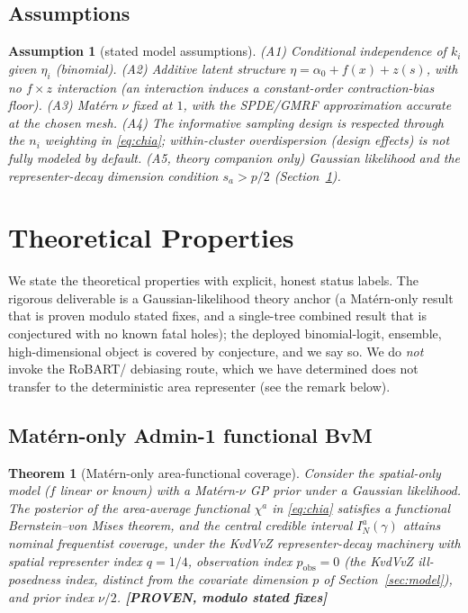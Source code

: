 \documentclass[11pt]{article}
\newtheorem{theorem}{Theorem}
\newtheorem{assumption}{Assumption}
\theoremstyle{remark}
\newcommand{\PROVENMOD}{\textnormal{\textbf{\textcolor{green!40!black}{[PROVEN, modulo stated fixes]}}}}
\newcommand{\chia}{\chi^a}
\begin{document}
\subsection{Assumptions}\label{sec:assumptions}

\begin{assumption}[stated model assumptions]\label{ass:model}
(A1) Conditional independence of $k_i$ given $\eta_i$ (binomial). (A2) Additive
latent structure $\eta=\alpha_0+f(x)+z(s)$, with no $f\times z$ interaction (an
interaction induces a constant-order contraction-bias floor). (A3) Mat\'ern $\nu$
fixed at $1$, with the SPDE/GMRF approximation accurate at the chosen mesh.
(A4) The informative sampling design is respected through the $n_i$ weighting in
\eqref{eq:chia}; within-cluster overdispersion (design effects) is not fully
modeled by default. (A5, theory companion only) Gaussian likelihood and the
representer-decay dimension condition $s_a>p/2$ (Section~\ref{sec:theory}).
\end{assumption}

\section{Theoretical Properties}\label{sec:theory}

We state the theoretical properties with explicit, honest status labels. The
rigorous deliverable is a Gaussian-likelihood theory anchor (a Mat\'ern-only
result that is proven modulo stated fixes, and a single-tree combined result
that is conjectured with no known fatal holes); the deployed binomial-logit,
ensemble, high-dimensional object is covered by conjecture, and we say so. We do
\emph{not} invoke the RoBART/\citet{breunig2025robart} debiasing route, which we
have determined does not transfer to the deterministic area representer (see the
remark below).

\subsection{Mat\'ern-only Admin-1 functional BvM}

\begin{theorem}[Mat\'ern-only area-functional coverage]\label{thm:matern}
Consider the spatial-only model ($f$ linear or known) with a Mat\'ern-$\nu$ GP
prior under a Gaussian likelihood. The posterior of the area-average functional
$\chia$ in \eqref{eq:chia} satisfies a functional Bernstein--von Mises theorem,
and the central credible interval $I^a_N(\gamma)$ attains nominal frequentist
coverage, under the KvdVvZ \citep{knapik2011bayesian} representer-decay machinery
with spatial representer index $q=1/4$, observation index $p_{\mathrm{obs}}=0$
(the KvdVvZ ill-posedness index, distinct from the covariate dimension $p$ of
Section~\ref{sec:model}), and prior index $\nu/2$. \PROVENMOD
\end{theorem}
\end{document}
